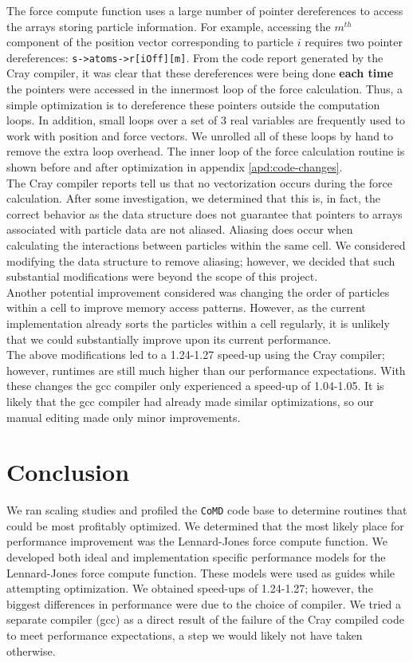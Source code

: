 \documentclass[12pt]{article}
\begin{document}
The force compute function uses a large number of pointer dereferences
to access the arrays storing particle information. For example,
accessing the $m^{th}$ component of the position vector corresponding
to particle $i$ requires two pointer dereferences:
\texttt{s->atoms->r[iOff][m]}. From the code report generated by the
Cray compiler, it was clear that these dereferences were being done
{\bf each time} the pointers were accessed in the innermost loop of
the force calculation.  Thus, a simple optimization is to dereference
these pointers outside the computation loops.  In addition, small
loops over a set of 3 real variables are frequently used to work with
position and force vectors. We unrolled all of these loops by hand to
remove the extra loop overhead. The inner loop of the force
calculation routine is shown before and after optimization in appendix
\ref{apd:code-changes}.
\\

The Cray compiler reports tell us that no vectorization occurs during
the force calculation. After some investigation, we determined that
this is, in fact, the correct behavior as the data structure does not
guarantee that pointers to arrays associated with particle data are
not aliased.  Aliasing does occur when calculating the interactions
between particles within the same cell. We considered modifying the
data structure to remove aliasing; however, we decided that such
substantial modifications were beyond the scope of this project.
\\

 Another potential improvement considered was changing the order of
particles within a cell to improve memory access patterns. However, as the
current implementation already sorts the particles within a cell regularly, it is unlikely 
that we could substantially improve upon its current performance. \\

 The above modifications led to a 1.24-1.27 speed-up using
the Cray compiler; however, runtimes are still much higher than our
performance expectations. With these changes the gcc compiler only
experienced a speed-up of 1.04-1.05. It is likely that the gcc
compiler had already made similar optimizations, so our manual editing
made only minor improvements.

\section{Conclusion}
We ran scaling studies and profiled the \texttt{CoMD} code base to
determine routines that could be most profitably optimized. We
determined that the most likely place for performance improvement was
the Lennard-Jones force compute function. We developed both ideal and
implementation specific performance models for the Lennard-Jones force
compute function. These models were used as guides while attempting
optimization. We obtained speed-ups of 1.24-1.27; however, the biggest
differences in performance were due to the choice of compiler. We
tried a separate compiler (gcc) as a direct result of the failure of
the Cray compiled code to meet performance expectations, a step we
would likely not have taken otherwise.
\\
\end{document}

